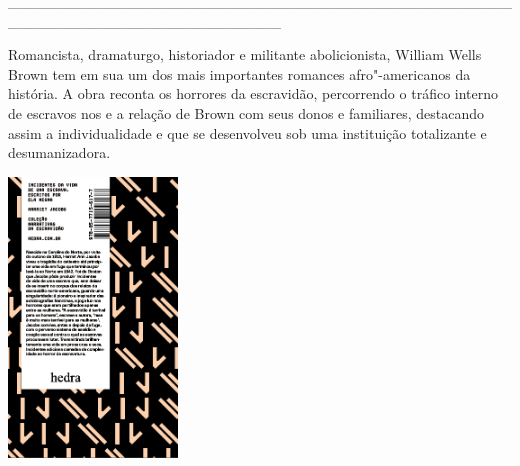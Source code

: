 \hspace*{-2cm}\_\_\_\_\_\_\_\_\_\_\_\_\_\_\_\_\_\_\_\_\_\_\_\_\_\_\_\_\_\_\_\_\_\_\_\_\_\_\_\_\_\_\_\_\_\_\_\_\_\_\_\_\_\_\_\_\_\_\_\_\_\_\_\_\_\_\_\_\_\_\_\_\_\_

\medskip

\noindent{}Romancista, dramaturgo, historiador e militante abolicionista, William Wells Brown tem em sua {} um dos mais importantes romances afro"-americanos da história. A obra reconta os horrores da escravidão, percorrendo o tráfico interno de escravos nos  e a relação de Brown com seus donos e familiares, destacando assim a individualidade e que se desenvolveu sob uma instituição totalizante e desumanizadora.

\hspace{.5cm}

\hspace*{-.4cm}\begin{minipage}[c]{0.90\linewidth}
\small{
{}}
\end{minipage}

\pagebreak

\hspace{.5cm}

\begin{center}
\hspace*{-2.5cm}
\hspace{2cm}\includegraphics[width=45mm]{./imgs/jacobs.png}
\end{center}


